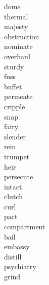 \documentclass[b5paper, 11pt]{ctexart}
\begin{document}
\begin{multicols*}{3}
\begin{description}
\item[dome]

\item[thermal]

\item[majesty]

\item[obstruction]

\item[nominate]

\item[overhaul]

\item[sturdy]

\item[fuss]

\item[buffet]

\item[permeate]

\item[cripple]

\item[snap]

\item[fairy]

\item[slender]

\item[rein]

\item[trumpet]

\item[heir]

\item[persecute]

\item[intact]

\item[clutch]

\item[curl]

\item[pact]

\item[compartment]

\item[bail]

\item[embassy]

\item[distill]

\item[psychiatry]

\item[grind]


\end{description}
\end{multicols*}
\end{document}

